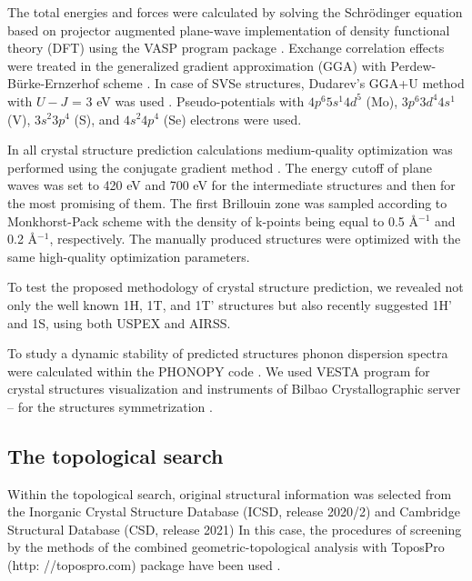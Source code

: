 \documentclass[a4paperm]{article}
\begin{document}
The total energies and forces were calculated by solving the Schr\"{o}dinger equation based on projector augmented plane-wave implementation \cite{blochl1994projector} of density functional theory (DFT) using the VASP program package \cite{vasp1,vasp2}.
Exchange correlation effects were treated in the generalized gradient approximation (GGA) with Perdew-B\"{u}rke-Ernzerhof scheme \cite{pbe}.
In case of SVSe structures, Dudarev’s GGA+U method \cite{gga+u} with $U-J$ = 3 eV was used \cite{PhysRevB.93.054429,C6CP06732H}.
Pseudo-potentials with $4p^6 5s^1 4d^5$ (Mo), $3p^6 3d^4 4s^1$ (V), $3s^2 3p^4$ (S), and $4s^2 4p^4$ (Se) electrons were used.

In all crystal structure prediction calculations medium-quality optimization was performed using the conjugate gradient method \cite{conjugate_gradient}. 
The energy cutoff of plane waves was set to 420 eV and 700 eV for the intermediate structures and then for the most promising of them. 
The first Brillouin zone was sampled according to Monkhorst-Pack scheme \cite{monkhorst1976special} with the density of k-points being equal to 0.5 \AA$^{-1}$ and 0.2 \AA$^{-1}$, respectively. 
The manually produced structures were optimized with the same high-quality optimization parameters.

To test the proposed methodology of crystal structure prediction, we revealed not only the well known 1H, 1T, and 1T' structures but also recently suggested 1H' and 1S, using both USPEX and AIRSS. 


To study a dynamic stability of predicted structures phonon dispersion spectra were calculated within the PHONOPY code \cite{phonopy}. 
We used VESTA program for crystal structures visualization \cite{momma2011vesta} and instruments of Bilbao Crystallographic server -- for the structures symmetrization \cite{bilbao}.



\subsection*{The topological search}

Within the topological search, original structural information was selected from the Inorganic Crystal Structure Database (ICSD, release 2020/2) \cite{icsd_1} and Cambridge Structural Database (CSD, release 2021) \cite{icsd_2} 
In this case, the procedures of screening  by the methods of the combined geometric-topological analysis with ToposPro (http: //topospro.com) package have been used \cite{topos_1}. 
\end{document}
